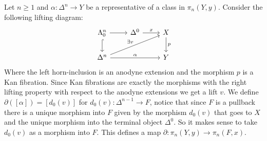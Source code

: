 \begin{construction}
    Let $n \geq 1$ and $\alpha \colon \Delta^n \to Y$ be a representative of a class in $\pi_n(Y,y)$.
    Consider the following lifting diagram:
    \[
    \begin{tikzcd}
        \Lambda_0^n 
        \ar[d, hook]
        \ar[r]
        &
        \Delta^0
        \ar[r, "x"]
        &
        X
        \ar[d,"p"]
        \\
        \Delta^n
        \ar[rru, "\exists v"]
        \ar[rr,"\alpha"]
        &&
        Y
    \end{tikzcd}
    \]
    Where the left horn-inclusion is an anodyne extension and the morphism $p$ is a Kan fibration. Since Kan fibrations are exactly the morphisms with the right lifting property with respect to the anodyne extensions we get a lift $v$.
    We define $\partial ( [\alpha] ) = [d_0(v)]$ for $d_0(v)\colon \Delta^{n-1} \to F$, notice that since $F$ is a pullback there is a unique morphism into $F$ given by the morphism $d_0(v)$ that goes to $X$ and the unique morphism into the terminal object $\Delta^0$.
    So it makes sense to take $d_0(v)$ as a morphism into $F$.
    This defines a map $\partial \colon \pi_n(Y,y) \to \pi_n(F,x)$.


\end{construction}
